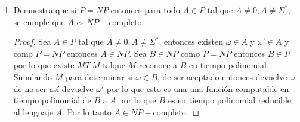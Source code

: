 \documentclass[letterpaper]{article}
\theoremstyle{definition}
\theoremstyle{lemathm}
\theoremstyle{lemathm}
\theoremstyle{lemathm}
\theoremstyle{lemademthm}
\newcommand{\1}{\mathbbm{1}}
\begin{document}
\begin{enumerate}
			\item Demuestra que si $P = NP$ entonces para todo $A\in P$ tal que $A\neq 0,A\neq \Sigma^*$, se cumple que $A$ es $NP-$completo.
			
			\begin{proof}
				Sea $A\in P$ tal que $A\neq 0,A\neq \Sigma^*$, entonces existen $\omega\in A$ y $\omega'\in\overline{A}$ y como $P = NP$ entonces $A\in NP$. Sea $B \in NP$ como $P = NP$ entonces $B\in P$ por lo que existe $MT \ M$ talque $M$ reconoce a $B$ en tiempo polinomial. Simulando $M$ para determinar si $\omega \in B$, de ser aceptado entonces devuelve $\omega$ de no ser así devuelve $\omega'$ por lo que esto es una una función computable en tiempo polinomial de $B$ a $A$ por lo que $B$ es en tiempo polinomial reducible al lenguaje $A$. Por lo tanto $A\in NP-$completo.
			\end{proof}

	\end{enumerate}
\end{document}
